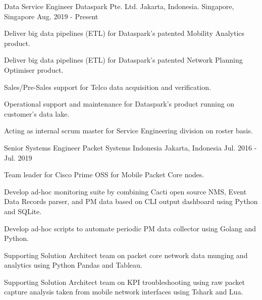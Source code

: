 

\begin{cventries}

\cventry
{Data Service Engineer} %
{Dataspark Pte. Ltd.} %
{Jakarta, Indonesia. Singapore, Singapore} %
{Aug. 2019 - Present} %
{
  \begin{cvitems} %
    \item {Deliver big data pipelines (ETL) for Dataspark's patented Mobility Analytics product.}
    \item {Deliver big data pipelines (ETL) for Dataspark's patented Network Planning Optimiser product.}
    \item {Sales/Pre-Sales support for Telco data acquisition and verification.}
    \item {Operational support and maintenance for Dataspark's product running on customer's data lake.}
    \item {Acting as internal scrum master for Service Engineering division on roster basis.}
  \end{cvitems}
}

  \cventry
    {Senior Systems Engineer} %
    {Packet Systems Indonesia} %
    {Jakarta, Indonesia} %
    {Jul. 2016 - Jul. 2019} %
    {
      \begin{cvitems} %
        \item {Team leader for Cisco Prime OSS for Mobile Packet Core nodes.}
        \item {Develop ad-hoc monitoring suite by combining Cacti open source NMS, Event Data Records parser, and PM data based on CLI output dashboard using Python and SQLite.}
        \item {Develop ad-hoc scripts to automate periodic PM data collector using Golang and Python.}
        \item {Supporting Solution Architect team on packet core network data munging and analytics using Python Pandas and Tableau.}
        \item {Supporting Solution Architect team on KPI troubleshooting using raw packet capture analysis taken from mobile network interfaces using Tshark and Lua.}
      \end{cvitems}
    }


\end{cventries}
